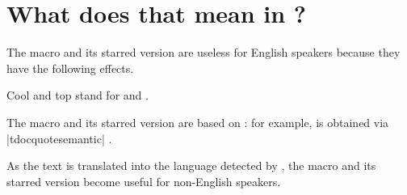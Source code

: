 \documentclass{tutodoc}
\begin{document}
\section{What does that mean in ?}

The macro  and its starred version are useless for English speakers because they have the following effects.


\begin{tdoclatex}
Cool and top stand for  and .
\end{tdoclatex}


The macro  and its starred version are based on  : for example,  is obtained via \tdocinlatex|tdocquote{semantic}| .


\begin{tdocnote}
    As the text  is translated into the language detected by \thisproj, the macro  and its starred version become useful for non-English speakers.
\end{tdocnote}
\end{document}
